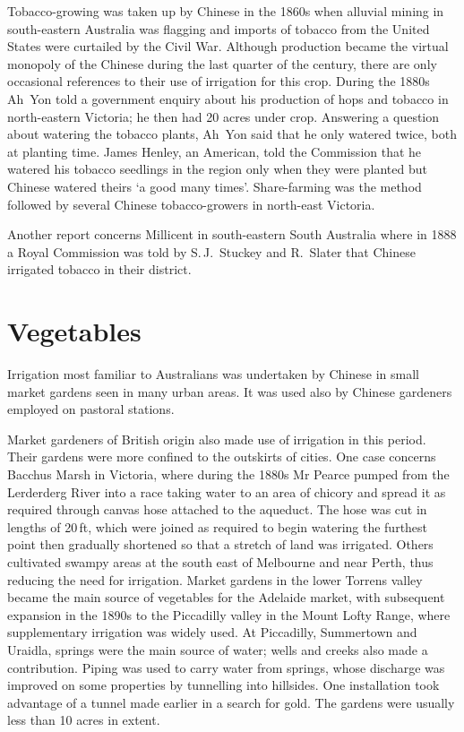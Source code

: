 Tobacco-growing was taken up by Chinese in the 1860s when alluvial
mining in south-eastern Australia was flagging and imports of tobacco
from the United States were curtailed by the Civil War.  Although
production became the virtual monopoly of the Chinese during the last
quarter of the century, there are only occasional references to their
use of irrigation for this crop.  During the 1880s Ah~Yon told a
government enquiry about his production of hops and tobacco in
north-eastern Victoria; he then had 20 acres under crop.  Answering a
question about watering the tobacco plants, Ah~Yon said that he only
watered twice, both at planting time.  James Henley, an American, told
the Commission that he watered his tobacco seedlings in the region
only when they were planted but Chinese watered theirs `a good many
times'.  Share-farming was the method followed by several Chinese
tobacco-growers in north-east Victoria.

Another report concerns Millicent in south-eastern South Australia
where in 1888 a Royal Commission was told by S.\,J.~Stuckey and
R.~Slater that Chinese irrigated tobacco in their
district.

\section*{Vegetables}

Irrigation most familiar to Australians was undertaken by Chinese in
small market gardens seen in many urban areas.  It was used also by
Chinese gardeners employed on pastoral stations.

Market gardeners of British origin also made use of irrigation in this
period.  Their gardens were more confined to the outskirts of cities.
One case concerns Bacchus Marsh in Victoria, where during the 1880s Mr
Pearce pumped from the Lerderderg River into a race taking water to an
area of chicory and spread it as required through canvas hose attached
to the aqueduct.  The hose was cut in lengths of 20\,ft, which were
joined as required to begin watering the furthest point then gradually
shortened so that a stretch of land was irrigated.  Others cultivated
swampy areas at the south east of Melbourne and near Perth, thus
reducing the need for irrigation.  Market gardens in the lower Torrens
valley became the main source of vegetables for the Adelaide market,
with subsequent expansion in the 1890s to the Piccadilly valley in the
Mount Lofty Range, where supplementary irrigation was widely used.  At
Piccadilly, Summertown and Uraidla, springs were the main source of
water; wells and creeks also made a contribution.  Piping was used to
carry water from springs, whose discharge was improved on some
properties by tunnelling into hillsides.  One installation took
advantage of a tunnel made earlier in a search for gold.  The gardens
were usually less than 10 acres in
extent.


